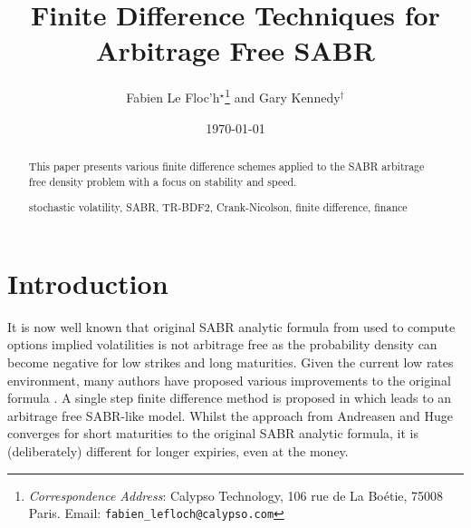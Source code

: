 \documentclass[]{rAMF2e}
\begin{document}
\doi{}
\issn{}  \issnp{}
\def\jobtag{}
\jname{}


\title{Finite Difference Techniques for Arbitrage Free SABR}
\author{Fabien {Le Floc'h}$^\star$\thanks{{\em{Correspondence Address}}: Calypso Technology, 106 rue de La Bo\'{e}tie, 75008 Paris. Email: \texttt{fabien\_lefloch@calypso.com} \vspace{6pt}} and Gary Kennedy$^\dag$}
%
\date{\today}

\maketitle
\newcommand{\sgn}{\mathop{\mathrm{sgn}}}
\begin{abstract}
This paper presents various finite difference schemes applied to the SABR arbitrage free density problem with a focus on stability and speed.
\begin{keywords}stochastic volatility, SABR, TR-BDF2, Crank-Nicolson, finite difference, finance\end{keywords}
\end{abstract}

\section{Introduction}
It is now well known that original SABR analytic formula from \citep{hagan2002managing} used to compute options implied volatilities is not arbitrage free as the probability density can become negative for low strikes and long maturities. Given the current low rates environment, many authors have proposed various improvements to the original formula \citep{obloj2008fine, johnson2009arbitrage, paulot2009asymptotic, benaim2008arbitrage}.  A single step finite difference method is proposed in \citep{andreasen2011zabr} which leads to an arbitrage free SABR-like model. Whilst the approach from Andreasen and Huge converges for short maturities to the original SABR analytic formula, it is (deliberately) different for longer expiries, even at the money.
\end{document}
